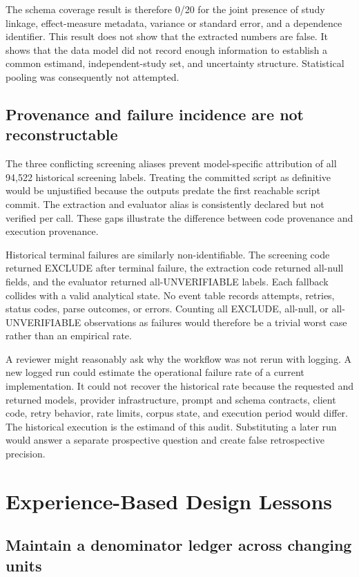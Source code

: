 \documentclass[acmsmall,anonymous,review]{acmart}
\begin{document}
The schema coverage result is therefore 0/20 for the joint presence of study linkage, effect-measure metadata, variance or standard error, and a dependence identifier. This result does not show that the extracted numbers are false. It shows that the data model did not record enough information to establish a common estimand, independent-study set, and uncertainty structure. Statistical pooling was consequently not attempted.

\subsection{Provenance and failure incidence are not reconstructable}

The three conflicting screening aliases prevent model-specific attribution of all 94,522 historical screening labels. Treating the committed script as definitive would be unjustified because the outputs predate the first reachable script commit. The extraction and evaluator alias is consistently declared but not verified per call. These gaps illustrate the difference between code provenance and execution provenance.

Historical terminal failures are similarly non-identifiable. The screening code returned EXCLUDE after terminal failure, the extraction code returned all-null fields, and the evaluator returned all-UNVERIFIABLE labels. Each fallback collides with a valid analytical state. No event table records attempts, retries, status codes, parse outcomes, or errors. Counting all EXCLUDE, all-null, or all-UNVERIFIABLE observations as failures would therefore be a trivial worst case rather than an empirical rate.

A reviewer might reasonably ask why the workflow was not rerun with logging. A new logged run could estimate the operational failure rate of a current implementation. It could not recover the historical rate because the requested and returned models, provider infrastructure, prompt and schema contracts, client code, retry behavior, rate limits, corpus state, and execution period would differ. The historical execution is the estimand of this audit. Substituting a later run would answer a separate prospective question and create false retrospective precision.

\section{Experience-Based Design Lessons}

\subsection{Maintain a denominator ledger across changing units}
\end{document}
